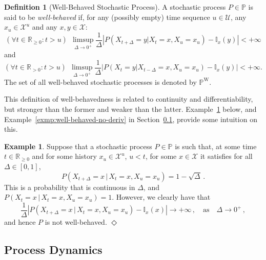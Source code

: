 \documentclass[10pt,a4paper]{paper}
\theoremstyle{definition}
\newtheorem{exmp}{Example}%
\newtheorem{definition}{Definition}
\newcommand{\reals}{\mathbb{R}}
\newcommand{\realsnonneg}{\reals_{\geq 0}}
\newcommand{\states}{\mathcal{X}}
\newcommand{\processes}{\mathbb{P}}
\newcommand{\wprocesses}{\processes^{\mathrm{W}}}
\newcommand{\ind}[1]{\mathbb{I}_{#1}}
\newcommand{\abs}[1]{\left\vert #1 \right\vert}
\newcommand{\exampleend}{\hfill$\Diamond$}
\begin{document}
\begin{definition}[Well-Behaved Stochastic Process]
\label{def:well-behaved}
A stochastic process $P\in\processes$ is said to be \emph{well-behaved} if, for any (possibly empty) time sequence $u\in\mathcal{U}$, any $x_u\in\states^u$ and any $x,y\in\states$:
\begin{equation}\label{eq:def:well-behaved:right}
(\forall t\in\reals_{\geq0}
\colon t> u)~~
\limsup_{\Delta\to 0^{+}}\frac{1}{\Delta}\abs{P(X_{t+\Delta}=y\vert X_t=x, X_u=x_u)-\ind{x}(y)}<+\infty
\end{equation}
and
\begin{equation}\label{eq:def:well-behaved:left}
(\forall t\in\reals_{>0}
\colon t> u)~~
\limsup_{\Delta\to 0^{+}}\frac{1}{\Delta}\abs{P(X_{t}=y\vert X_{t-\Delta}=x, X_u=x_u)-\ind{x}(y)}<+\infty.
\end{equation}
The set of all well-behaved stochastic processes is denoted by $\wprocesses$.
\end{definition}

This definition of well-behavedness is related to continuity and differentiability, but stronger than the former and weaker than the latter. Example~\ref{exmp:well-behaved} below, and Example~\ref{exmp:well-behaved-no-deriv} in Section~\ref{sec:dynamics}, provide some intuition on this.

\begin{exmp}\label{exmp:well-behaved}
Suppose that a stochastic process $P\in\processes$ is such that, at some time $t\in\realsnonneg$ and for some history $x_u\in\states^u$, $u<t$, for some $x\in\states$ it satisfies for all $\Delta\in[0,1]$,
\begin{equation*}
P(X_{t+\Delta}=x\,\vert\,X_{t}=x,X_u=x_u) = 1-\sqrt{\Delta}\,.
\end{equation*}
This is a probability that is continuous in $\Delta$, and $P(X_{t}=x\,\vert\,X_{t}=x,X_u=x_u) = 1$. However, we clearly have that
\begin{equation*}
\frac{1}{\Delta}\abs{P(X_{t+\Delta}=x\,\vert\,X_{t}=x,X_u=x_u) - \ind{x}(x)} \to +\infty\,,\quad\text{as}\quad \Delta\to0^+\,,
\end{equation*}
and hence $P$ is not well-behaved.
\exampleend
\end{exmp}

\subsection{Process Dynamics}\label{sec:dynamics}
\end{document}
